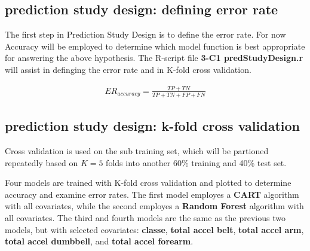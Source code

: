 \documentclass[10pt, twoside]{article}
\begin{document}
\begin{center}
\subsection{prediction study design: defining error rate}
\vspace{-3ex}
\end{center}

\noindent
The first step in Prediction Study Design is to define the error rate. For now
Accuracy will be employed to determine which model function is best appropriate for
answering the above hypothesis. The R-script file \textbf{3-C1 predStudyDesign.r} will assist
in definging the error rate and in K-fold cross validation.
\smallskip

\begin{equation*}
\begin{aligned}
ER_{accuracy} = \frac{TP + TN}{TP + TN + FP + FN}
\end{aligned}
\end{equation*}
\bigskip

\begin{center}
\subsection{prediction study design: k-fold cross validation}
\vspace{-3ex}
\end{center}

\noindent
Cross validation is used on the sub training set, which will be partioned repeatedly based
on $K = 5$ folds into another 60\% training and 40\% test set. 
\smallskip

Four models are trained with K-fold cross validation and plotted to determine accuracy and
examine error rates. The first model employes a \textbf{CART} algorithm with all covariates, while
the second employes a \textbf{Random Forest} algorithm with all covariates. The third and fourth models
are the same as the previous two models, but with selected covariates: \textbf{classe}, \textbf{total accel belt},
\textbf{total accel arm}, \textbf{total accel dumbbell}, and \textbf{total accel forearm}.
\bigskip
\end{document}
